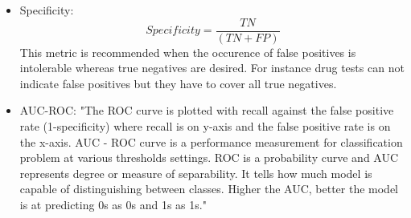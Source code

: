 \begin{itemize}
\item Specificity:
\begin{equation}
Specificity = \frac{TN}{(TN + FP)}
\end{equation}
This metric is recommended when the occurence of false positives is intolerable whereas true negatives are desired. For instance drug tests can not indicate false positives but they have to cover all true negatives.
\item AUC-ROC:
"The ROC curve is plotted with recall against the false positive rate (1-specificity) where recall is on y-axis and the false positive rate is on the x-axis. AUC - ROC curve is a performance measurement for classification problem at various thresholds settings. ROC is a probability curve and AUC represents degree or measure of separability. It tells how much model is capable of distinguishing between classes. Higher the AUC, better the model is at predicting 0s as 0s and 1s as 1s\cite{26}."

\end{itemize}




